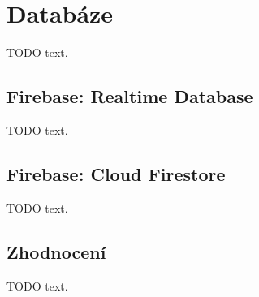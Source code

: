 \section{Databáze}

TODO text.

\subsection{Firebase: Realtime Database}

TODO text.

\subsection{Firebase: Cloud Firestore}

TODO text.

\subsection{Zhodnocení}

TODO text.
